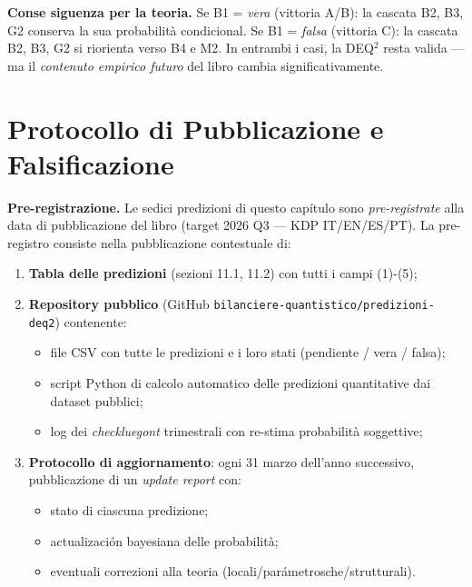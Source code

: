 \Hypoth{} \textbf{Conse siguenza per la teoria.} Se B1 = \emph{vera}
(vittoria A/B): la cascata B2, B3, G2 conserva la sua probabilità
condicional. Se B1 = \emph{falsa} (vittoria C): la cascata B2, B3, G2
si riorienta verso B4 e M2. In entrambi i casi, la DEQ$^2$ resta valida ---
ma il \emph{contenuto empirico futuro} del libro cambia
significativamente.



\section{Protocollo di Pubblicazione e
Falsificazione}\label{protocollo-di-pubblicazione-e-falsificación}

\Hypoth{} \textbf{Pre-registrazione.} Le sedici predizioni di questo
capítulo sono \emph{pre-registrate} alla data di pubblicazione del libro
(target 2026 Q3 --- KDP IT/EN/ES/PT). La pre-registro consiste
nella pubblicazione contestuale di:

\begin{enumerate}
\def\labelenumi{\arabic{enumi}.}
\tightlist
\item
  \textbf{Tabla delle predizioni} (sezioni 11.1, 11.2) con tutti i
  campi (1)-(5);
\item
  \textbf{Repository pubblico} (GitHub
  \texttt{bilanciere-quantistico/predizioni-deq2}) contenente:

  \begin{itemize}
  \tightlist
  \item
    file CSV con tutte le predizioni e i loro stati (pendiente / vera /
    falsa);
  \item
    script Python di calcolo automatico delle predizioni quantitative
    dai dataset pubblici;
  \item
    log dei \emph{checkluegont} trimestrali con re-stima probabilità
    soggettive;
  \end{itemize}
\item
  \textbf{Protocollo di aggiornamento}: ogni 31 marzo dell'anno
  successivo, pubblicazione di un \emph{update report} con:

  \begin{itemize}
  \tightlist
  \item
    stato di ciascuna predizione;
  \item
    actualización bayesiana delle probabilità;
  \item
    eventuali correzioni alla teoria (locali/parámetrosche/strutturali).
  \end{itemize}
\end{enumerate}

